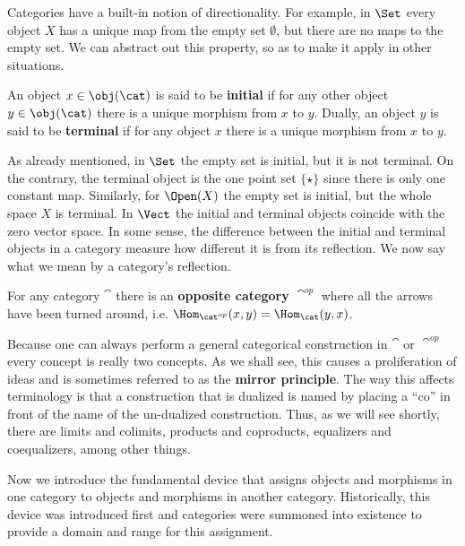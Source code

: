 Categories have a built-in notion of directionality. For example, in $\Set$ every object $X$ has a unique map from the empty set $\emptyset$, but there are no maps to the empty set. We can abstract out this property, so as to make it apply in other situations.

\begin{defn}
	An object $x\in\obj(\cat)$ is said to be \textbf{initial} if for any other object $y\in\obj(\cat)$ there is a unique morphism from $x$ to $y$. Dually, an object $y$ is said to be \textbf{terminal} if for any object $x$ there is a unique morphism from $x$ to $y$. 
\end{defn}

As already mentioned, in $\Set$ the empty set is initial, but it is not terminal. On the contrary, the terminal object is the one point set $\{\star\}$ since there is only one constant map. Similarly, for $\Open(X)$ the empty set is initial, but the whole space $X$ is terminal. In $\Vect$ the initial and terminal objects coincide with the zero vector space. In some sense, the difference between the initial and terminal objects in a category measure how different it is from its reflection. We now say what we mean by a category's reflection. 

\begin{ex}
 For any category $\cat$ there is an \textbf{opposite category} $\cat^{op}$ where all the arrows have been turned around, i.e. $\Hom_{\cat^{op}}(x,y)=\Hom_{\cat}(y,x)$.
\end{ex}
\begin{rmk}
Because one can always perform a general categorical construction in $\cat$ or $\cat^{op}$ every concept is really two concepts. As we shall see, this causes a proliferation of ideas and is sometimes referred to as the \textbf{mirror principle}. The way this affects terminology is that a construction that is dualized is named by placing a ``co'' in front of the name of the un-dualized construction. Thus, as we will see shortly, there are limits and colimits, products and coproducts, equalizers and coequalizers, among other things.
\end{rmk}

Now we introduce the fundamental device that assigns objects and morphisms in one category to objects and morphisms in another category. Historically, this device was introduced first and categories were summoned into existence to provide a domain and range for this assignment. 

